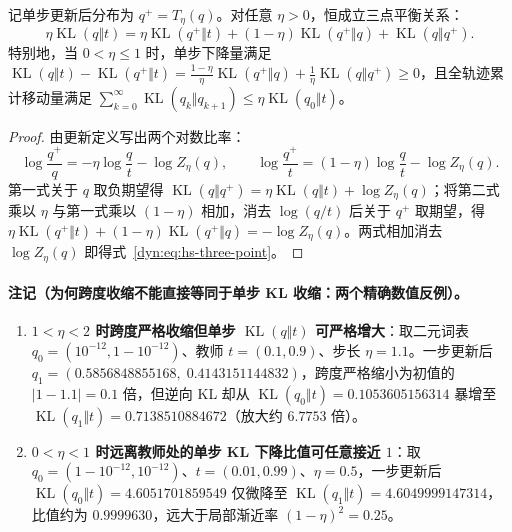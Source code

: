 \documentclass[lang=cn,scheme=chinese,openany]{elegantbook}
\newcommand{\KL}{\operatorname{KL}}
\begin{document}
\begin{theorem}
\label{dyn:thm:hs-three-point}
记单步更新后分布为 $q^+=T_\eta(q)$。对任意 $\eta>0$，恒成立三点平衡关系：
\begin{equation}\label{dyn:eq:hs-three-point}
 \eta\KL(q\Vert t)
 =\eta\KL(q^+\Vert t)
 +(1-\eta)\KL(q^+\Vert q)
 +\KL(q\Vert q^+).
\end{equation}
特别地，当 $0<\eta\le 1$ 时，单步下降量满足 $\KL(q\Vert t)-\KL(q^+\Vert t)=\frac{1-\eta}{\eta}\KL(q^+\Vert q)+\frac1\eta\KL(q\Vert q^+)\ge 0$，且全轨迹累计移动量满足 $\sum_{k=0}^\infty\KL(q_k\Vert q_{k+1})\le\eta\KL(q_0\Vert t)$。
\end{theorem}
\begin{proof}
由更新定义写出两个对数比率：
\begin{equation*}
 \log\frac{q^+}{q}=-\eta\log\frac{q}{t}-\log Z_\eta(q),\qquad
 \log\frac{q^+}{t}=(1-\eta)\log\frac{q}{t}-\log Z_\eta(q).
\end{equation*}
第一式关于 $q$ 取负期望得 $\KL(q\Vert q^+)=\eta\KL(q\Vert t)+\log Z_\eta(q)$；将第二式乘以 $\eta$ 与第一式乘以 $(1-\eta)$ 相加，消去 $\log(q/t)$ 后关于 $q^+$ 取期望，得 $\eta\KL(q^+\Vert t)+(1-\eta)\KL(q^+\Vert q)=-\log Z_\eta(q)$。两式相加消去 $\log Z_\eta(q)$ 即得式~\eqref{dyn:eq:hs-three-point}。
\end{proof}

\paragraph{注记（为何跨度收缩不能直接等同于单步 KL 收缩：两个精确数值反例）。}
\begin{enumerate}
\item \textbf{$1<\eta<2$ 时跨度严格收缩但单步 $\KL(q\Vert t)$ 可严格增大}：取二元词表 $q_0=(10^{-12},1-10^{-12})$、教师 $t=(0.1,0.9)$、步长 $\eta=1.1$。一步更新后 $q_1=(0.5856848855168,\;0.4143151144832)$，跨度严格缩小为初值的 $|1-1.1|=0.1$ 倍，但逆向 KL 却从 $\KL(q_0\Vert t)=0.1053605156314$ 暴增至 $\KL(q_1\Vert t)=0.7138510884672$（放大约 $6.7753$ 倍）。
\item \textbf{$0<\eta<1$ 时远离教师处的单步 KL 下降比值可任意接近 $1$}：取 $q_0=(1-10^{-12},10^{-12})$、$t=(0.01,0.99)$、$\eta=0.5$，一步更新后 $\KL(q_0\Vert t)=4.6051701859549$ 仅微降至 $\KL(q_1\Vert t)=4.6049999147314$，比值约为 $0.9999630$，远大于局部渐近率 $(1-\eta)^2=0.25$。
\end{enumerate}
\end{document}
